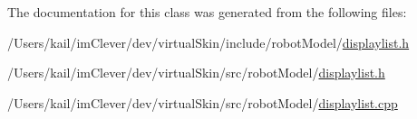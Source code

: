 The documentation for this class was generated from the following files:\begin{DoxyCompactItemize}
\item 
/Users/kail/imClever/dev/virtualSkin/include/robotModel/\hyperlink{include_2robot_model_2displaylist_8h}{displaylist.h}\item 
/Users/kail/imClever/dev/virtualSkin/src/robotModel/\hyperlink{src_2robot_model_2displaylist_8h}{displaylist.h}\item 
/Users/kail/imClever/dev/virtualSkin/src/robotModel/\hyperlink{displaylist_8cpp}{displaylist.cpp}\end{DoxyCompactItemize}
